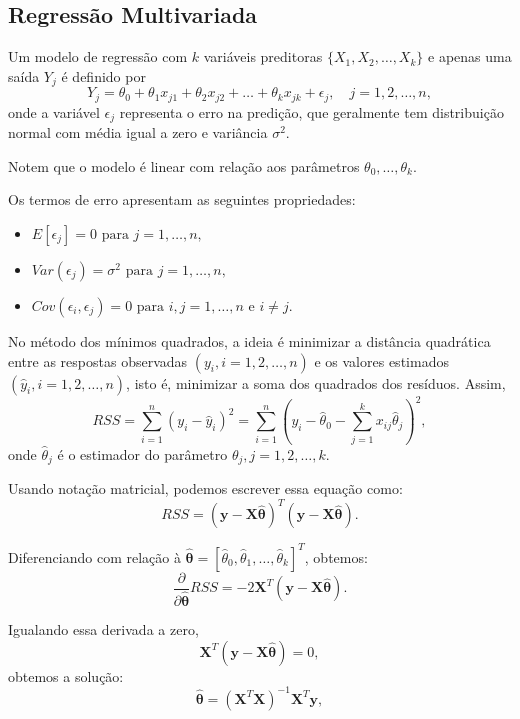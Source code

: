 \documentclass{article}
\begin{document}
\subsection{Regressão Multivariada}
Um modelo de regressão com $k$ variáveis preditoras $\{X_1, X_2, \ldots, X_k\}$ e apenas uma saída $Y_j$ é definido por
    $$
    Y_j = \theta_0 + \theta_1 x_{j1} + \theta_2 x_{j2} + \ldots + \theta_k x_{jk} + \epsilon_j, \quad j = 1, 2, \ldots, n,
    $$
onde a variável $\epsilon_j$ representa o erro na predição, que geralmente tem distribuição normal com média igual a zero e variância $\sigma^2$.

Notem que o modelo é linear com relação aos parâmetros $\theta_0, \ldots, \theta_k$.

Os termos de erro apresentam as seguintes propriedades:
\begin{itemize}
    \item $E[\epsilon_j] = 0 \text{ para } j = 1, \ldots, n,$
    \item $Var(\epsilon_j) = \sigma^2 \text{ para } j = 1, \ldots, n,$
    \item $Cov(\epsilon_i, \epsilon_j) = 0 \text{ para } i, j = 1, \ldots, n \text{ e } i \neq j.$
\end{itemize}

No método dos mínimos quadrados, a ideia é minimizar a distância quadrática entre as respostas observadas $(y_i, i=1,2,\ldots,n)$ e os valores estimados $(\hat{y}_i, i=1,2,\ldots,n)$, isto é, minimizar a soma dos quadrados dos resíduos. Assim,
    $$
    RSS = \sum_{i=1}^{n} (y_i - \hat{y}_i)^2 = 
    \sum_{i=1}^{n} 
    \left(
    y_i - \hat{\theta}_0 - \sum_{j=1}^{k} x_{ij}\hat{\theta}_j
    \right)^2,
    $$
onde $\hat{\theta}_j$ é o estimador do parâmetro $\theta_j, j = 1, 2, \ldots, k.$

Usando notação matricial, podemos escrever essa equação como:
    $$
    RSS = (\mathbf{y} - \mathbf{X}\hat{\boldsymbol{\theta}})^T (\mathbf{y} - \mathbf{X}\hat{\boldsymbol{\theta}}).
    $$

Diferenciando com relação à $\hat{\boldsymbol{\theta}} = [\hat{\theta}_0, \hat{\theta}_1, \ldots, \hat{\theta}_k]^T$, obtemos:
    $$
    \frac{\partial}{\partial \hat{\boldsymbol{\theta}}} RSS = -2\mathbf{X}^T (\mathbf{y} - \mathbf{X}\hat{\boldsymbol{\theta}}).
    $$

Igualando essa derivada a zero,
    $$
    \mathbf{X}^T(\mathbf{y} - \mathbf{X}\hat{\boldsymbol{\theta}}) = 0,
    $$
obtemos a solução:
    $$
    \hat{\boldsymbol{\theta}} = (\mathbf{X}^T\mathbf{X})^{-1}\mathbf{X}^T\mathbf{y},
    $$
\end{document}
